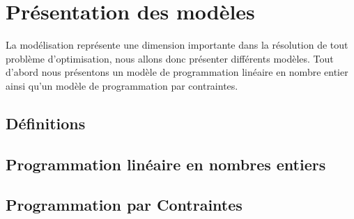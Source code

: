 
\chapter{  Présentation des modèles\label{chap:Modele}}
La modélisation représente une dimension importante dans la résolution de tout problème d'optimisation, nous allons donc présenter différents modèles. Tout d'abord nous présentons un modèle de programmation linéaire en nombre entier ainsi qu'un modèle de programmation par contraintes.
 


\section{Définitions \label{sec:M_def}}


\section{Programmation linéaire en nombres entiers\label{sec:M_IP}}



\section{Programmation par Contraintes\label{sec:M_CP}}
